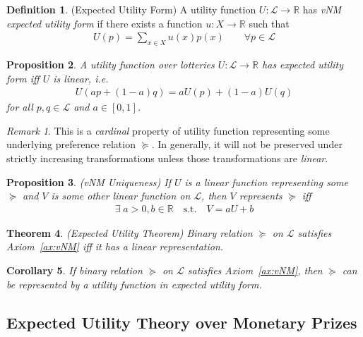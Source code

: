 \documentclass[12pt]{article}
\theoremstyle{plain}
\newtheorem{thm}{Theorem}[section]
\newtheorem{prop}[thm]{Proposition}
\newtheorem{cor}[thm]{Corollary}
\theoremstyle{definition}
\newtheorem{defn}[thm]{Definition}
\theoremstyle{remark}
\newtheorem*{rmk}{Remark}
\newcommand{\ra}{\rightarrow}
\newcommand{\calL}{\mathcal{L}}
\newcommand{\R}{\mathbb{R}}
\begin{document}
\begin{defn}(Expected Utility Form)
A utility function $U:\calL\ra \R$ has \emph{vNM expected utility form}
if there exists a function $u:X\ra \R$ such that
\begin{align*}
  U(p) = \sum_{x\in X}u(x)p(x)
  \qquad \forall p \in\calL
\end{align*}
\end{defn}

\begin{prop}
A utility function over lotteries $U:\calL \ra \R$ has expected utility
form iff $U$ is linear, i.e.
\begin{align*}
  U(ap + (1-a)q)
  = aU(p) + (1-a) U(q)
\end{align*}
for all $p,q\in\calL$ and $a\in [0,1]$.
\end{prop}
\begin{rmk}
This is a \emph{cardinal} property of utility function representing some
underlying preference relation $\succeq$. In generally, it will not be
preserved under strictly increasing transformations unless those
transformations are \emph{linear}.
\end{rmk}

\begin{prop}\emph{(vNM Uniqueness)}
If $U$ is a linear function representing some $\succeq$ and $V$ is some
other linear function on $\calL$, then $V$ represents $\succeq$ iff
\begin{align*}
  \exists \; a>0, b \in\R
  \quad
  \text{s.t.}
  \quad
  V = aU+b
\end{align*}
\end{prop}

\begin{thm}\emph{(Expected Utility Theorem)}
Binary relation $\succeq$ on $\calL$ satisfies
Axiom~\ref{ax:vNM} iff it has a linear representation.
\end{thm}

\begin{cor}
If binary relation $\succeq$ on $\calL$ satisfies
Axiom~\ref{ax:vNM}, then $\succeq$ can be represented by a utility
function in expected utility form.
\end{cor}


\clearpage
\subsection{Expected Utility Theory over Monetary Prizes}





\end{document}
